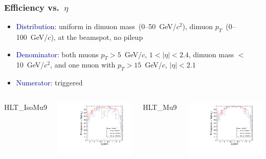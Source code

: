 \documentclass[compress]{beamer}
\begin{document}
\begin{frame}
\frametitle{Efficiency vs.\ $\eta$}
\begin{itemize}
\item \textcolor{darkblue}{Distribution:} uniform in dimuon mass~(0--50~GeV/$c^2$), dimuon $p_T$~(0--100~GeV/$c$), at the beamspot, no pileup

\item \textcolor{darkblue}{Denominator:} both muons $p_T > 5$~GeV/$c$, $1 < |\eta| < 2.4$, dimuon mass $<$ 10~GeV/$c^2$, and one muon with $p_T > 15$~GeV/$c$, $|\eta| < 2.1$

\item \textcolor{darkblue}{Numerator:} triggered
\end{itemize}

\vfill
\begin{columns}
\centering HLT\_IsoMu9

\includegraphics[width=\linewidth]{eta_mass10cut_pluscut_IsoMu9.pdf}

\centering HLT\_Mu9

\includegraphics[width=\linewidth]{eta_mass10cut_pluscut_Mu9.pdf}


\end{columns}
\end{frame}
\end{document}
